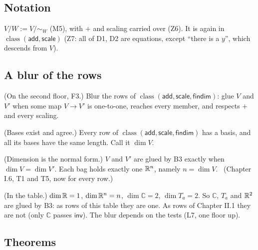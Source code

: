 \subsection*{Notation}

\begin{lines}
\item[\lab{N3}] $V/W := V/{\sim_W}$ (M5), with $+$ and scaling carried over (Z6). It is again in $\operatorname{class}(\mathsf{add}, \mathsf{scale})$ (Z7: all of D1, D2 are equations, except ``there is a $y$'', which descends from $V$).
\end{lines}

\subsection*{A blur of the rows}

\begin{lines}
\item[\lab{B3}] (On the second floor, F3.) Blur the rows of $\operatorname{class}(\mathsf{add}, \mathsf{scale}, \mathsf{findim})$: glue $V$ and $V'$ when some map $V \to V'$ is one-to-one, reaches every member, and respects $+$ and every scaling.
\item[\lab{T1}] (Bases exist and agree.) Every row of $\operatorname{class}(\mathsf{add}, \mathsf{scale}, \mathsf{findim})$ has a basis, and all its bases have the same length. Call it $\dim V$.
\item[\lab{T2}] (Dimension is the normal form.) $V$ and $V'$ are glued by B3 exactly when $\dim V = \dim V'$. Each bag holds exactly one $\mathbb{R}^n$, namely $n = \dim V$. \ (Chapter I.6, T1 and T5, now for every row.)
\item[\lab{P9}] (In the table.) $\dim \mathbb{R} = 1$, $\dim \mathbb{R}^n = n$, $\dim \mathbb{C} = 2$, $\dim T_a = 2$. So $\mathbb{C}$, $T_a$ and $\mathbb{R}^2$ are glued by B3: as rows of this table they are one. As rows of Chapter II.1 they are not (only $\mathbb{C}$ passes $\mathsf{inv}$). The blur depends on the tests (L7, one floor up).
\end{lines}

\subsection*{Theorems}

